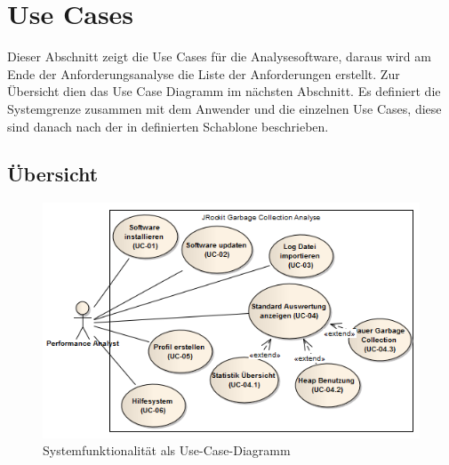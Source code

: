 \section{Use Cases}\label{use_cases}
Dieser Abschnitt zeigt die Use Cases für die Analysesoftware, daraus wird am Ende der Anforderungsanalyse die Liste der Anforderungen erstellt. Zur Übersicht dien das Use Case Diagramm im nächsten Abschnitt. Es definiert die Systemgrenze zusammen mit dem Anwender und die einzelnen Use Cases, diese sind danach nach der in \cite[S. 78-79]{pohl2010basiswissen} definierten Schablone beschrieben.
\subsection{Übersicht}\label{systemfunktionalitaet}
 \begin{figure}[H]
  	\centering
    	\includegraphics[width=14cm]{images/anforderungen_use-case}
        	\caption{Systemfunktionalität als Use-Case-Diagramm}
\end{figure}
